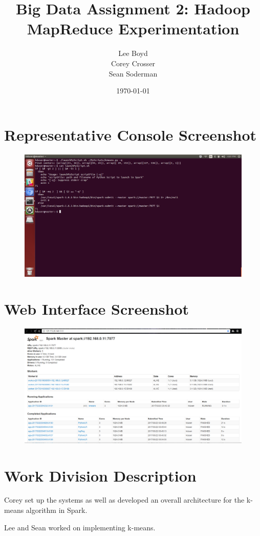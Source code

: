 \documentclass[14pt]{extarticle}
\begin{document}
\title{Big Data Assignment 2: Hadoop MapReduce Experimentation}
\author{Lee Boyd \\
        Corey Crosser \\
        Sean Soderman
        }
\date{\today}
\maketitle

\section{Representative Console Screenshot}
\begin{figure}[H]
\centering
\includegraphics[width=5.2in]{conoutput.png}
\end{figure}

\section{Web Interface Screenshot}
\begin{figure}[H]
\centering
\includegraphics[width=5.2in]{SparkScreenShot.png}
\end{figure}

\section{Work Division Description}
Corey set up the systems as well as developed an overall architecture for the k-means
algorithm in Spark.

Lee and Sean worked on implementing k-means.

\end{document}

